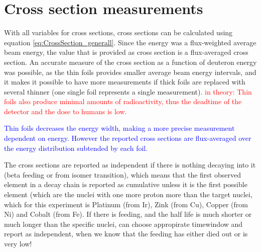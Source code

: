 \section{Cross section measurements} 
With all variables for cross sections, cross sections can be calculated using equation \ref{eq:CrossSection_generall}. Since the energy was a flux-weighted average beam energy, the value that is provided as cross section is a flux-averaged cross section. An accurate measure of the cross section as a function of deuteron energy was possible, as the thin foils provides smaller average beam energy intervals, and it makes it possible to have more measurements if thick foils are replaced with several thinner (one single foil represents a single measurement). \textcolor{red}{in theory: Thin foils also produce minimal amounts of radioactivity, thus the deadtime of the detector and the dose to humans is low.}%
%


\textcolor{blue}{Thin foils decreases the energy width, making a more precise measurement dependent on energy. However the reported cross sections are flux-averaged over the energy distribution subtended by each foil. } 

The cross sections are reported as independent if there is nothing decaying into it (beta feeding or from isomer transition), which means that the first observed element in a decay chain is reported as cumulative unless it is the first possible element (which are the nuclei with one more proton more than the target nuclei, which for this experiment is Platinum (from Ir), Zink (from Cu), Copper (from Ni) and Cobalt (from Fe). If there is feeding, and the half life is much shorter or much longer than the specific nuclei, can choose appropirate timewindow and report as independent, when we know that the feeding has either died out or is very low! 

